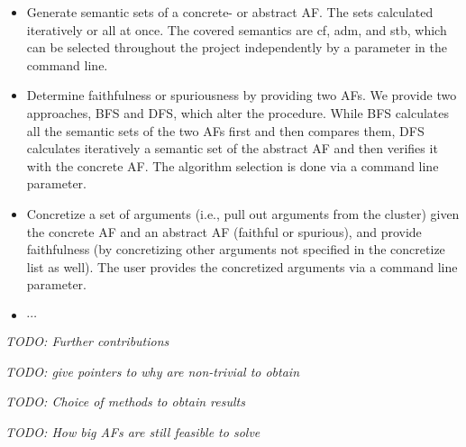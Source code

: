 \begin{itemize}
    \item Generate semantic sets of a concrete- or abstract \ac{AF}. The sets calculated iteratively or all at once. The covered semantics are \ac{cf}, \ac{adm}, and \ac{stb}, which can be selected throughout the project independently by a parameter in the command line.

    \item Determine faithfulness or spuriousness by providing two \acp{AF}. We provide two approaches, \ac{BFS} and \ac{DFS}, which alter the procedure. While \ac{BFS} calculates all the semantic sets of the two \acp{AF} first and then compares them, \ac{DFS} calculates iteratively a semantic set of the abstract \ac{AF} and then verifies it with the concrete \ac{AF}. The algorithm selection is done via a command line parameter.

    \item Concretize a set of arguments (i.e., pull out arguments from the cluster) given the concrete \ac{AF} and an abstract \ac{AF} (faithful or spurious), and provide faithfulness (by concretizing other arguments not specified in the concretize list as well). The user provides the concretized arguments via a command line parameter.

    \item $\cdots$
\end{itemize}

\noindent

\textit{TODO: Further contributions}

\textit{TODO: give pointers to why are non-trivial to obtain}

\textit{TODO: Choice of methods to obtain results}

\textit{TODO: How big AFs are still feasible to solve}

